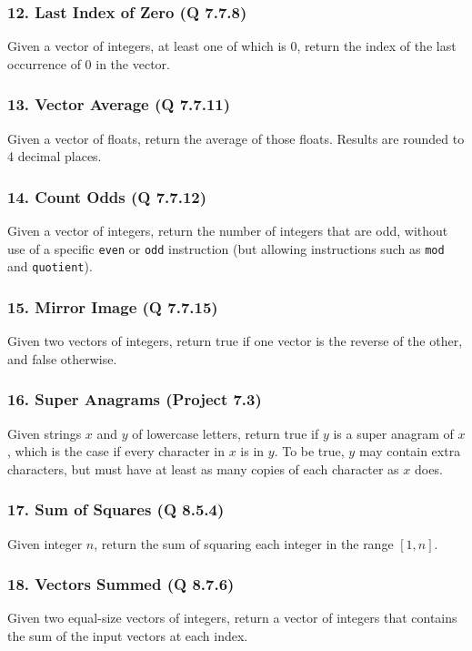 \documentclass{sig-alternate}
\begin{document}
\subsubsection*{12. Last Index of Zero (Q 7.7.8)}
Given a vector of integers, at least one of which is 0, return the index of the last occurrence of 0 in the vector.

\subsubsection*{13. Vector Average (Q 7.7.11)}
Given a vector of floats, return the average of those floats. Results are rounded to 4 decimal places.

\subsubsection*{14. Count Odds (Q 7.7.12)}
Given a vector of integers, return the number of integers that are odd, without use of a specific \texttt{even} or \texttt{odd} instruction (but allowing instructions such as \texttt{mod} and \texttt{quotient}).

\subsubsection*{15. Mirror Image (Q 7.7.15)}
Given two vectors of integers, return true if one vector is the reverse of the other, and false otherwise.

\subsubsection*{16. Super Anagrams (Project 7.3)}
Given strings $x$ and $y$ of lowercase letters, return true if $y$ is a super anagram of $x$, which is the case if every character in $x$ is in $y$. To be true, $y$ may contain extra characters, but must have at least as many copies of each character as $x$ does.

\subsubsection*{17. Sum of Squares (Q 8.5.4)}
Given integer $n$, return the sum of squaring each integer in the range $[1, n]$.

\subsubsection*{18. Vectors Summed (Q 8.7.6)}
Given two equal-size vectors of integers, return a vector of integers that contains the sum of the input vectors at each index.
\end{document}
